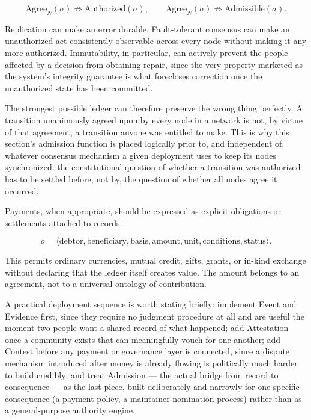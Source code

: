 \documentclass[11pt,oneside]{article}
\theoremstyle{plain}
\theoremstyle{definition}
\begin{document}
\begin{equation}
\mathrm{Agree}_N(\sigma) \not\Rightarrow \mathrm{Authorized}(\sigma), \qquad
\mathrm{Agree}_N(\sigma) \not\Rightarrow \mathrm{Admissible}(\sigma).
\end{equation}

Replication can make an error durable. Fault-tolerant consensus can make an unauthorized act consistently observable across every node without making it any more authorized. Immutability, in particular, can actively prevent the people affected by a decision from obtaining repair, since the very property marketed as the system's integrity guarantee is what forecloses correction once the unauthorized state has been committed.

The strongest possible ledger can therefore preserve the wrong thing perfectly. A transition unanimously agreed upon by every node in a network is not, by virtue of that agreement, a transition anyone was entitled to make. This is why this section's admission function is placed logically prior to, and independent of, whatever consensus mechanism a given deployment uses to keep its nodes synchronized: the constitutional question of whether a transition was authorized has to be settled before, not by, the question of whether all nodes agree it occurred.

Payments, when appropriate, should be expressed as explicit obligations or settlements attached to records:

\begin{equation}
o = \langle \mathrm{debtor},\mathrm{beneficiary},\mathrm{basis},
\mathrm{amount},\mathrm{unit},\mathrm{conditions},\mathrm{status}\rangle.
\end{equation}

This permits ordinary currencies, mutual credit, gifts, grants, or in-kind exchange without declaring that the ledger itself creates value. The amount belongs to an agreement, not to a universal ontology of contribution.

A practical deployment sequence is worth stating briefly: implement Event and Evidence first, since they require no judgment procedure at all and are useful the moment two people want a shared record of what happened; add Attestation once a community exists that can meaningfully vouch for one another; add Contest before any payment or governance layer is connected, since a dispute mechanism introduced after money is already flowing is politically much harder to build credibly; and treat Admission --- the actual bridge from record to consequence --- as the last piece, built deliberately and narrowly for one specific consequence (a payment policy, a maintainer-nomination process) rather than as a general-purpose authority engine.
\end{document}
